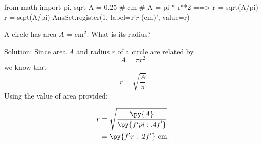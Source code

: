 \begin{pycode}
from math import pi, sqrt
A = 0.25 # cm
# A = pi * r**2 ==> r = sqrt(A/pi)
r = sqrt(A/pi)
AnsSet.register(1, label=r'\(r\) (cm)', value=r)
\end{pycode}
A circle has area $A$ =  cm$^2$.  What is its radius?

\ifshowsolutions

Solution: Since area $A$ and radius $r$ of a circle are related by
\[
    A = \pi r^2
\]
we know that
\[
    r = \sqrt{\frac{A}{\pi}}
\]
Using the value of area provided:

\begin{align*}
r & = \sqrt{\frac{\py{A}}{\py{f'{pi:.4f}'}}}\\
  & = \py{f'{r:.2f}'}\ \mbox{cm.}
\end{align*}

\fi